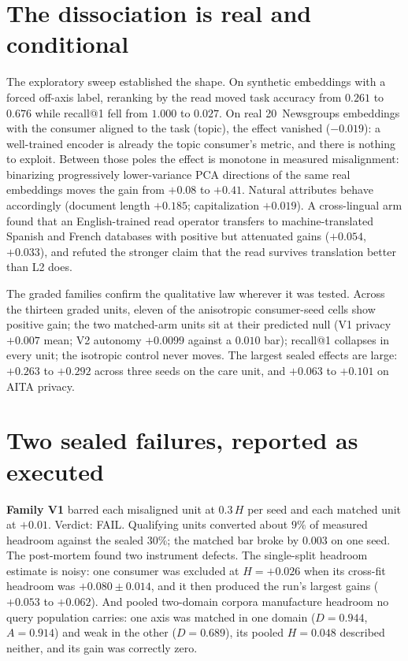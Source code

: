 \documentclass{article}
\begin{document}
\section{The dissociation is real and conditional}

The exploratory sweep established the shape. On synthetic embeddings with a
forced off-axis label, reranking by the read moved task accuracy from $0.261$
to $0.676$ while recall@1 fell from $1.000$ to $0.027$. On real 20~Newsgroups
embeddings with the consumer aligned to the task (topic), the effect
vanished ($-0.019$): a well-trained encoder is already the topic consumer's
metric, and there is nothing to exploit. Between those poles the effect is
monotone in measured misalignment: binarizing progressively lower-variance
PCA directions of the same real embeddings moves the gain from $+0.08$ to
$+0.41$. Natural attributes behave accordingly (document length $+0.185$;
capitalization $+0.019$). A cross-lingual arm found that an English-trained
read operator transfers to machine-translated Spanish and French databases
with positive but attenuated gains ($+0.054$, $+0.033$), and refuted the
stronger claim that the read survives translation better than L2 does.

The graded families confirm the qualitative law wherever it was tested.
Across the thirteen graded units, eleven of the anisotropic consumer-seed
cells show positive gain; the two matched-arm units sit at their predicted
null (V1 privacy $+0.007$ mean; V2 autonomy $+0.0099$ against a $0.010$
bar); recall@1 collapses in every unit; the isotropic control never moves.
The largest sealed effects are large: $+0.263$ to $+0.292$ across three
seeds on the care unit, and $+0.063$ to $+0.101$ on AITA privacy.

\section{Two sealed failures, reported as executed}

\textbf{Family V1} barred each misaligned unit at $0.3\,H$ per seed and each
matched unit at $+0.01$. Verdict: FAIL. Qualifying units converted about
$9\%$ of measured headroom against the sealed $30\%$; the matched bar broke
by $0.003$ on one seed. The post-mortem found two instrument defects. The
single-split headroom estimate is noisy: one consumer was excluded at
$H=+0.026$ when its cross-fit headroom was $+0.080\pm0.014$, and it then
produced the run's largest gains ($+0.053$ to $+0.062$). And pooled
two-domain corpora manufacture headroom no query population carries: one
axis was matched in one domain ($D=0.944$, $A=0.914$) and weak in the other
($D=0.689$), its pooled $H=0.048$ described neither, and its gain was
correctly zero.
\end{document}
